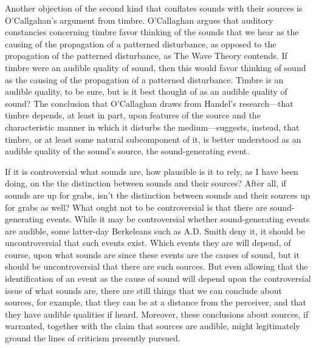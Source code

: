 \documentclass[12pt]{article}
\begin{document}
Another objection of the second kind that conflates sounds with their sources is O’Callgahan’s \citeyearpar[89]{OCallaghan:2007xy} argument from timbre. O’Callaghan argues that auditory constancies concerning timbre favor thinking of the sounds that we hear as the causing of the propagation of a patterned disturbance, as opposed to the propagation of the patterned disturbance, as The Wave Theory contends. If timbre were an audible quality of sound, then this would favor thinking of sound as the causing of the propagation of a patterned disturbance. Timbre is an audible quality, to be sure, but is it best thought of as an audible quality of sound? The conclusion that O’Callaghan draws from Handel’s \citeyearpar{Handel:1995aa} research---that timbre depends, at least in part, upon features of the source and the characteristic manner in which it disturbs the medium---suggests, instead, that timbre, or at least some natural subcomponent of it, is better understood as an audible quality of the sound’s source, the sound-generating event.

If it is controversial what sounds are, how plausible is it to rely, as I have been doing, on the the distinction between sounds and their sources? After all, if sounds are up for grabs, isn’t the distinction between sounds and their sources up for grabs as well? What ought not to be controversial is that there are sound-generating events. While it may be controversial whether sound-generating events are audible, some latter-day Berkeleans such as A.D. Smith \citeyearpar{Smith:2002sa} deny it, it should be uncontroversial that such events exist. Which events they are will depend, of course, upon what sounds are since these events are the causes of sound, but it should be uncontroversial that there are such sources. But even allowing that the identification of an event as the cause of sound will depend upon the controversial issue of what sounds are, there are still things that we can conclude about sources, for example, that they can be at a distance from the perceiver, and that they have audible qualities if heard. Moreover, these conclusions about sources, if warranted, together with the claim that sources are audible, might legitimately ground the lines of criticism presently pursued. 
\end{document}
